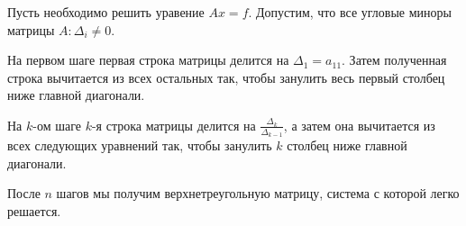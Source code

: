 \documentclass{article}
\begin{document}
\begin{algorithm}
\label{eq:gauss_single_division}
	Пусть необходимо решить уравение $Ax=f$. Допустим, что все угловые
	миноры матрицы $A:\Delta_i\ne 0$.

	На первом шаге первая строка матрицы делится на $\Delta_1=a_{11}$.
	Затем полученная строка вычитается из всех остальных так, чтобы занулить
	весь первый столбец ниже главной диагонали.

	На $k$-ом шаге $k$-я строка матрицы делится на
	$\frac{\Delta_k}{\Delta_{k-1}}$, а затем она вычитается из всех
	следующих уравнений так, чтобы занулить $k$ столбец ниже главной
	диагонали.

	После $n$ шагов мы получим верхнетреугольную матрицу, система с которой
	легко решается.
\end{algorithm}
\end{document}

